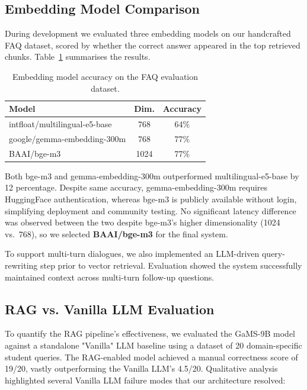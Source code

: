 \documentclass[fleqn,moreauthors,10pt]{ds_report}
\begin{document}
\subsection*{Embedding Model Comparison}

During development we evaluated three embedding models on our handcrafted FAQ dataset,
scored by whether the correct answer appeared in the top retrieved chunks.
Table~\ref{tab:embeddings} summarises the results.

\begin{table}[hbt]
    \caption{Embedding model accuracy on the FAQ evaluation dataset.}
    \centering
    \begin{tabular}{l c c}
        \toprule
        Model & Dim. & Accuracy \\
        \midrule
        intfloat/multilingual-e5-base \cite{mult-e5-base} & 768 & 64\% \\
        google/gemma-embedding-300m \cite{embedding_gemma_2025} & 768 & 77\% \\
        BAAI/bge-m3 \cite{baai3} & 1024 & 77\% \\
        \bottomrule
    \end{tabular}
    \label{tab:embeddings}
\end{table}

Both bge-m3 \cite{baai3} and gemma-embedding-300m \cite{embedding_gemma_2025} outperformed
multilingual-e5-base \cite{mult-e5-base} by 12 percentage.
Despite same accuracy, gemma-embedding-300m requires HuggingFace authentication,
whereas bge-m3 is publicly available without login, simplifying deployment and community testing.
No significant latency difference was observed between the two despite bge-m3's higher
dimensionality (1024 vs.\ 768), so we selected \textbf{BAAI/bge-m3} for the final system.

To support multi-turn dialogues, we also implemented an LLM-driven query-rewriting step prior to vector retrieval. Evaluation showed the system successfully maintained context across multi-turn follow-up questions.

\subsection*{RAG vs. Vanilla LLM Evaluation}

To quantify the RAG pipeline's effectiveness, we evaluated the GaMS-9B model against a standalone "Vanilla" LLM baseline using a dataset of 20 domain-specific student queries. The RAG-enabled model achieved a manual correctness score of 19/20, vastly outperforming the Vanilla LLM's 4.5/20. Qualitative analysis highlighted several Vanilla LLM failure modes that our architecture resolved:
\end{document}

